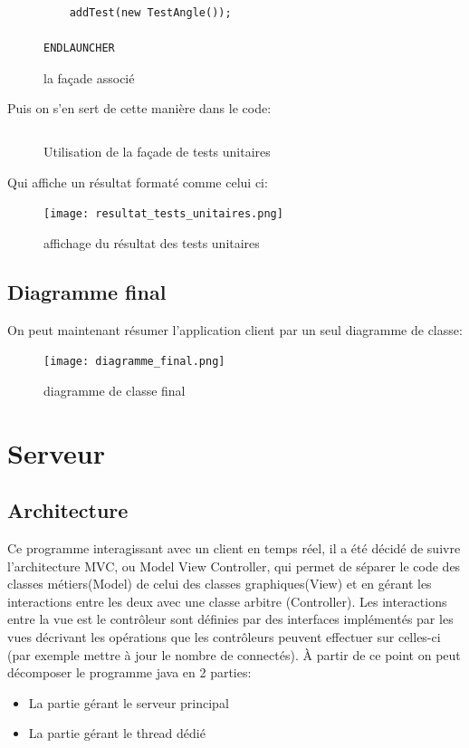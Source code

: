\documentclass[10pt,a4paper]{report}
\begin{document}
\begin{spacing}{0.8}
\begin{figure}[H]
\begin{verbatim}
    addTest(new TestAngle());

ENDLAUNCHER
\end{verbatim}
\caption{la façade associé}
\end{figure}
Puis on s'en sert de cette manière dans le code:
\begin{figure}[H]
\begin{verbatim}

\end{verbatim}
\caption{Utilisation de la façade de tests unitaires}
\end{figure}
Qui affiche un résultat formaté comme celui ci:
\begin{figure}[H]
\texttt{[image: resultat\_tests\_unitaires.png]}
\caption{affichage du résultat des tests unitaires}
\end{figure}

\chapter{Diagramme final}
On peut maintenant résumer l'application client par un seul diagramme de classe:

\begin{figure}[H]
\texttt{[image: diagramme\_final.png]}
\caption{diagramme de classe final}
\end{figure}

\part{Serveur}
\chapter{Architecture}
Ce programme interagissant avec un client en temps réel, il a été décidé de suivre l'architecture MVC, ou Model View Controller, qui permet de séparer le code des classes métiers(Model) de celui des classes graphiques(View) et en gérant les interactions entre les deux avec une classe arbitre (Controller).
Les interactions entre la vue est le contrôleur sont définies par des interfaces implémentés par les vues décrivant les opérations que les contrôleurs peuvent effectuer sur  celles-ci (par exemple mettre à jour le nombre de connectés).
À partir de ce point on peut décomposer le programme java en 2 parties:
\begin{itemize}
\item La partie gérant le serveur principal
\item La partie gérant le thread dédié
\end{itemize}

\end{spacing}
\end{document}
